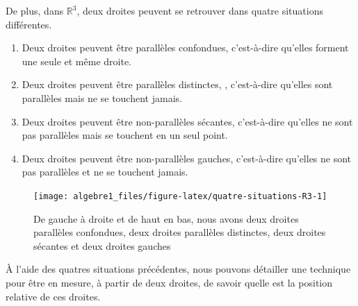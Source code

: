 \documentclass[]{book}
\providecommand{\tightlist}{%
  \setlength{\itemsep}{0pt}\setlength{\parskip}{0pt}}
\theoremstyle{definition}
\theoremstyle{definition}
\theoremstyle{definition}
\theoremstyle{remark}
\begin{document}
De plus, dans \(\mathbb{R}^3\), deux droites peuvent se retrouver dans quatre situations différentes.

\begin{enumerate}
\def\labelenumi{\arabic{enumi}.}
\tightlist
\item
  Deux droites peuvent être parallèles confondues, c'est-à-dire qu'elles forment une seule et même droite.
\item
  Deux droites peuvent être parallèles distinctes, , c'est-à-dire qu'elles sont parallèles mais ne se touchent jamais.
\item
  Deux droites peuvent être non-parallèles sécantes, c'est-à-dire qu'elles ne sont pas parallèles mais se touchent en un seul point.
\item
  Deux droites peuvent être non-parallèles gauches, c'est-à-dire qu'elles ne sont pas parallèles et ne se touchent jamais.
\end{enumerate}

\begin{figure}

{\centering \texttt{[image: algebre1\_files/figure-latex/quatre-situations-R3-1]} 

}

\caption{De gauche à droite et de haut en bas, nous avons deux droites parallèles confondues, deux droites parallèles distinctes, deux droites sécantes et deux droites gauches}\label{fig:quatre-situations-R3}
\end{figure}

À l'aide des quatres situations précédentes, nous pouvons détailler une technique pour être en mesure, à partir de deux droites, de savoir quelle est la position relative de ces droites.
\end{document}
